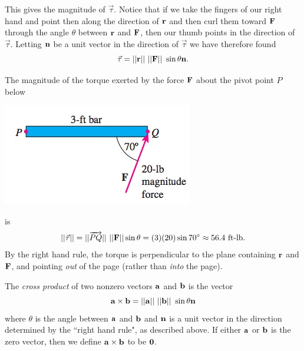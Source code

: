 \documentclass[12pt,letterpaper,reqno]{article}
\numberwithin{equation}{section}
\newcommand{\ti}[1]{\textit{#1}}
\begin{document}
This gives the magnitude of $\vec{\tau}$. Notice that if we take the fingers of our right hand and point then along the direction of ${\bf r}$ and then curl them toward ${\bf F}$ through the angle $\theta$ between ${\bf r}$ and ${\bf F}$, then our thumb points in the direction of $\vec{\tau}$. Letting ${\bf n}$ be a unit vector in the direction of $\vec{\tau}$ we have therefore found
\begin{equation}
	\vec{\tau}=||{\bf r}|| \ ||{\bf F}|| \ \sin \theta{\bf n}.
\end{equation}

\begin{example}
The magnitude of the torque exerted by the force ${\bf F}$ about the pivot point $P$ below 

\begin{center}
	\includegraphics[scale=0.5]{figures_mvc/torque_example}
\end{center}

is 
\begin{align*}
	||\vec{\tau}||=||\overrightarrow{PQ}|| \ ||{\bf F}|| \sin \theta = (3)(20)\sin 70^\circ \approx 56.4 \text{ ft-lb}.
\end{align*}
By the right hand rule, the torque is perpendicular to the plane  containing ${\bf r}$ and ${\bf F}$, and pointing \ti{out} of the page (rather than \ti{into} the page).
\end{example}


\begin{defn}
The \ti{cross product} of two nonzero vectors ${\bf a}$ and ${\bf b}$ is the vector
\begin{equation}
	{\bf a} \times {\bf b}=||{\bf a}|| \ ||{\bf b}|| \ \sin \theta{\bf n}
\end{equation}
where $\theta$ is the angle between ${\bf a}$ and ${\bf b}$ and ${\bf n}$ is a unit vector in the direction determined by the ``right hand rule", as described above. If either ${\bf a}$ or ${\bf b}$ is the zero vector, then we define ${\bf a} \times {\bf b}$ to be ${\bf 0}$.
\end{defn}
\end{document}
